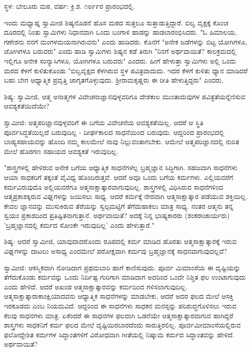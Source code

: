 \begin{center}
ಸ್ಥಳ: ಬೇಲೂರು ಮಠ, ವರ್ಷ: ಕ್ರಿ.ಶ. ೧೮೯೯ರ ಪ್ರಾರಂಭದಲ್ಲಿ.
\end{center}

ಇಂದು ಮಧ್ಯಾಹ್ನ ಸ್ವಾಮೀಜಿ ಶಿಷ್ಯನೊಡನೆ ಹೊಸ ಮಠದ ಸುತ್ತಲೂ ಸುತ್ತಾಡುತ್ತಿದ್ದಾರೆ. ಬಿಲ್ವ ವೃಕ್ಷಕ್ಕೆ ಕೊಂಚ ದೂರದಲ್ಲಿ ನಿಂತು ಸ್ವಾಮಿಗಳು ನಿಧಾನವಾಗಿ ಒಂದು ಬಂಗಾಳಿ ಹಾಡನ್ನು ಹಾಡಲಾರಂಭಿಸಿದರು. "ಓ ಹಿಮಾಲಯ, ಗಣೇಶನು ನನಗೆ ಮಂಗಳಮಯನಾಗಿರುವನು" ಎಂದು ಹಾಡಿದರು. ಕೊನೆಗೆ "ಅನೇಕ ಜಡೆಗಳನ್ನು ಬಿಟ್ಟ ಯೋಗಿಗಳೂ, ಜೋಗಿಗಳೂ ಬರುವರು" ಎಂದು ಹಾಡಿ ಸ್ವಾಮಿಗಳು ಶಿಷ್ಯನ ಕಡೆ ತಿರುಗಿ "ನಿನಗೆ ಅರ್ಥವಾಯಿತೆ? ಕಾಲಕ್ರಮದಲ್ಲಿ ಇಲ್ಲಿಗೂ ಅನೇಕ ಸಂನ್ಯಾಸಿಗಳೂ, ಯೋಗಿಗಳೂ ಬರುವರು" ಎಂದರು. ಹೀಗೆ ಹೇಳುತ್ತಾ ಸ್ವಾಮಿಗಳು ಅಲ್ಲಿ ಒಂದು ಮರದ ಕೆಳಗೆ ಕುಳಿತುಕೊಂಡು "ಬಿಲ್ವವೃಕ್ಷದ ಕೆಳಗಿರುವ ಸ್ಥಳ ಪವಿತ್ರವಾದುದು. ಇದರ ಕೆಳಗೆ ಕುಳಿತು ಧ್ಯಾನ ಮಾಡಿದರೆ ಬಹು ಬೇಗ ಆಧ್ಯಾತ್ಮಿಕ ಪ್ರವೃತ್ತಿ ಜಾಗೃತಗೊಳ್ಳುವುದು. ಶ‍್ರೀರಾಮಕೃಷ್ಣರು ಈ ರೀತಿ ಹೇಳುತ್ತಿದ್ದರು" ಎಂದರು.

ಶಿಷ್ಯ: ಸ್ವಾಮೀಜಿ, ಆತ್ಮ ಅನಾತ್ಮಗಳ ವಿವೇಚನಾಜ್ಞಾನವುಳ್ಳವರಿಗೂ ದೇಶಕಾಲ ಮುಂತಾದುವುಗಳ ಪವಿತ್ರತೆಯನ್ನೆಣಿಸುವ ಆವಶ್ಯಕತೆಯಿದೆಯೇ?

ಸ್ವಾಮೀಜಿ: ಆತ್ಮಪರಿಜ್ಞಾನವುಳ್ಳವರಿಗೆ ಈ ಬಗೆಯ ವಿವೇಚನೆಯ ಆವಶ್ಯಕತೆಯಿಲ್ಲ. ಆದರೆ ಆ ಸ್ಥಿತಿ ಪೂರ್ವಸಿದ್ಧತೆಯಿಲ್ಲದೆ ಬರುವುದಿಲ್ಲ - ದೀರ್ಘಕಾಲದ ಸಾಧನೆಯಿಂದ ಬರುವುದು. ಆದ್ದರಿಂದ ಪ್ರಾರಂಭದಲ್ಲಿ ಬಾಹ್ಯಸಹಾಯವನ್ನು ಹೊಂದಿ ನಮ್ಮ ಕಾಲಮೇಲೆ ನಾವು ನಿಲ್ಲುವಂತಾಗಬೇಕು. ಆಮೇಲೆ ಆತ್ಮಪರಿಜ್ಞಾನದಲ್ಲಿ ನುರಿತ ಮೇಲೆ ಹೊರಗಣ ಸಹಾಯದ ಆವಶ್ಯಕತೆ ಇರುವುದಿಲ್ಲ.

"ಶಾಸ್ತ್ರಗಳಲ್ಲಿ ಹೇಳಿರುವ ಅನೇಕ ಬಗೆಯ ಆಧ್ಯಾತ್ಮಿಕ ಸಾಧನೆಗಳೆಲ್ಲ ಬ್ರಹ್ಮಜ್ಞಾನ ಸಿದ್ಧಿಗಾಗಿ. ಸಹಜವಾಗಿ ಸಾಧನೆಗಳು ಆಯಾ ಸಾಧಕರಿಗೆ ತಕ್ಕಂತೆ ವೈವಿಧ್ಯ ಹೊಂದಿರುತ್ತವೆ. ಆದರೆ ಅವೂ ಒಂದು ಬಗೆಯ ಕರ್ಮಗಳು. ಎಲ್ಲಿಯವರೆಗೆ ಕರ್ಮವಿರುವುದೊ ಅಲ್ಲಿಯವರೆಗೂ ಆತ್ಮಸಾಕ್ಷಾತ್ಕಾರವಾಗುವುದಿಲ್ಲ. ಶಾಸ್ತ್ರಗಳಲ್ಲಿ ವಿಧಿಸಿರುವ ಸಾಧನೆಗಳಿಂದ ಆತ್ಮಪ್ರಕಾಶಕ್ಕಿರುವ ವಿಘ್ನಗಳನ್ನು ಜಯಿಸಲು ಸಾಧ್ಯ. ಆದರೆ ಕರ್ಮಕ್ಕೆ ನೇರವಾಗಿ ಆತ್ಮಸಾಕ್ಷಾತ್ಕಾರ ಪಡೆಯುವ ಶಕ್ತಿಯಿಲ್ಲ. ಕೇವಲ ಜ್ಞಾನವನ್ನು ಮುಸುಕಿರುವ ತೆರೆಯನ್ನು ಸ್ವಲ್ಪಮಟ್ಟಿಗೆ ತೆಗೆದುಹಾಕಲು ಮಾತ್ರ ಸಾಧ್ಯ. ನಂತರ ಆತ್ಮನು ತನ್ನ ಸ್ವಯಂ ಪ್ರಕಾಶದಿಂದ ಪ್ರತಿಷ್ಟಿತನಾಗುತ್ತಾನೆ. ಅರ್ಥವಾಯಿತೆ? ಅದಕ್ಕೆ ನಿನ್ನ ಭಾಷ್ಯಕಾರರು (ಶಂಕರಾಚಾರ್ಯರು) 'ಬ್ರಹ್ಮಜ್ಞಾನದಲ್ಲಿ ಕರ್ಮದ ಸೋಂಕೇ ಇರುವುದಿಲ್ಲ' ಎಂದು ಹೇಳುತ್ತಾರೆ."

ಶಿಷ್ಯ: ಆದರೆ ಸ್ವಾಮೀಜಿ, ಯಾವುದಾದರೊಂದು ರೂಪದಲ್ಲಿ ಕರ್ಮ ಮಾಡಿದ ಹೊರತು ಆತ್ಮಸಾಕ್ಷಾತ್ಕಾರಕ್ಕೆ ಇರುವ ವಿಘ್ನಗಳನ್ನು ದಾಟಲು ಅಸಾಧ್ಯ ಎಂದಮೇಲೆ ಪರೋಕ್ಷವಾಗಿ ಕರ್ಮವು ಬ್ರಹ್ಮಜ್ಞಾನಕ್ಕೆ ಸಾಧನವಾಗುವುದಲ್ಲವೆ?

ಸ್ವಾಮೀಜಿ: ಆಕಸ್ಮಿಕವಾಗಿ ನೋಡಿದಾಗ ಪ್ರಥಮಬಾರಿ ಹಾಗೆ ಕಾಣಿಸುವುದು. ಪೂರ್ವ ಮಿಮಾಂಸೆಯ ಈ ದೃಷ್ಟಿಯನ್ನು ತೆಗೆದುಕೊಂಡು ಕರ್ಮವನ್ನು ಒಂದು ನಿರ್ದಿಷ್ಟ ಗುರಿಗಾಗಿ ಮಾಡಿದಾಗ ಅದರಿಂದ ಒಂದೇ ನಿಶ್ಚಿತ ಫಲ ಉಂಟಾಗುವುದು ಎಂದು ಹೇಳಿದೆ. ಆದರೆ ಅಖಂಡ ಆತ್ಮಸಾಕ್ಷಾತ್ಕಾರವನ್ನು ಕರ್ಮದಿಂದ ಗಳಿಸಲಾಗುವುದಿಲ್ಲ. ಆತ್ಮಸಾಕ್ಷಾತ್ಕಾರಾಕಾಂಕ್ಷಿಯಾದವನು ಆಧ್ಯಾತ್ಮಿಕ ಸಾಧನೆಗಳನ್ನು ಮಾಡಬೇಕು, ಆದರೆ ಅದರ ಫಲದ ಮೇಲೆ ಆಸಕ್ತಿ ಇರಕೂಡದು ಎಂಬ ನಿಯಮವಿದೆ. ಆದ್ದರಿಂದ ಈ ಸಾಧನೆಗಳು ಸಾಧಕನ ಮನಸ್ಸನ್ನು ಪರಿಶುದ್ಧಗೊಳಿಸಲು ಇರುವ ಕೆಲವು ಸಾಧನಗಳು ಮಾತ್ರ. ಏಕೆಂದರೆ ಈ ಸಾಧನಗಳ ಫಲವಾಗಿ ಒಡನೆಯೇ ಆತ್ಮಸಾಕ್ಷಾತ್ಕಾರವಾಗುವ ಹಾಗಿದ್ದರೆ ಶಾಸ್ತ್ರಗಳು ಸಾಧಕನಿಗೆ ಕರ್ಮ ಫಲದ ಮೇಲೆ ದೃಷ್ಟಿಯಿರಬಾರದೆಂದು ಸಾರುತ್ತಿರಲಿಲ್ಲ. ಪೂರ್ವಮೀಮಾಂಸೆಯಲ್ಲಿರುವ ಫಲೋದ್ದೇಶಿತ ಕರ್ಮಗಳ ಸಿದ್ಧಾಂತಗಳಿಗೆ ವಿರೋಧವಾಗಿ ಗೀತೆಯಲ್ಲಿ ನಿಷ್ಕಾಮ ಕರ್ಮದ ಸಿದ್ಧಾಂತವನ್ನು ಹೇಳಿದೆ. ಅರ್ಥವಾಯಿತೆ?


